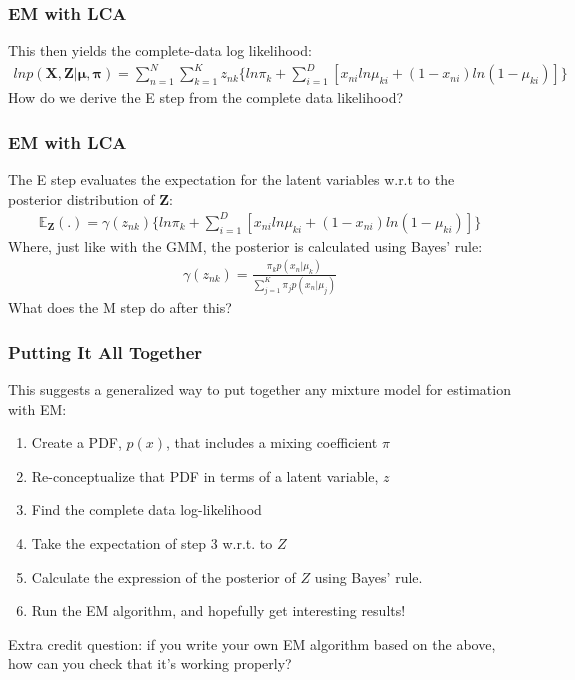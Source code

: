 \documentclass{beamer}
\begin{document}
\begin{frame}
\frametitle{EM with LCA}
	This then yields the complete-data log likelihood:
	\begin{align*}
	ln p(\mathbf{X}, \mathbf{Z}|\mathbf{\mu}, \mathbf{\pi}) = \sum_{n=1}^{N}\sum_{k=1}^{K} z_{nk} \{ln \pi_k + \sum_{i=1}^{D}[x_{ni} ln \mu_{ki} + (1 - x_{ni})ln(1-\mu_{ki})]\}
	\end{align*}
	How do we derive the E step from the complete data likelihood?
\end{frame}

\begin{frame}
\frametitle{EM with LCA}
	The E step evaluates the expectation for the latent variables w.r.t to the posterior distribution of $\mathbf{Z}$:
	\begin{align*}
	\mathbb{E}_{\mathbf{Z}}(.) = \gamma(z_{nk})\{ln \pi_k + \sum_{i=1}^{D}[x_{ni} ln \mu_{ki} + (1 - x_{ni})ln(1-\mu_{ki})]\}
	\end{align*}
	Where, just like with the GMM, the posterior is calculated using Bayes' rule:
	\begin{align*}
	\gamma(z_{nk}) =  \frac{\pi_k p(x_n|\mu_k)}{\sum_{j =1}^{K} \pi_j p(x_n | \mu_j)}
	\end{align*}
	What does the M step do after this?

\end{frame}

\begin{frame}
\frametitle{Putting It All Together}
This suggests a generalized way to put together any mixture model for estimation with EM:
\begin{enumerate}
	\item Create a PDF, $p(x)$, that includes a mixing coefficient $\pi$
	\item Re-conceptualize that PDF in terms of a latent variable, $z$
	\item Find the complete data log-likelihood
	\item Take the expectation of step 3 w.r.t.  to $Z$
	\item Calculate the expression of the posterior of $Z$ using Bayes' rule.
	\item Run the EM algorithm, and hopefully get interesting results!
\end{enumerate}
Extra credit question: if you write your own EM algorithm based on the above, how can you check that it's working properly?
\end{frame}
\end{document}
